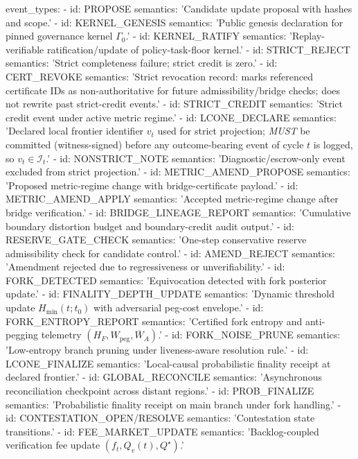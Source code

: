 \documentclass[11pt,a4paper]{article}
\newcommand{\cI}{\mathcal{I}}
\theoremstyle{definition}
\theoremstyle{remark}
\begin{document}
\begin{YAMLtiny}
event_types:
  - id: PROPOSE
    semantics: 'Candidate update proposal with hashes and scope.'
  - id: KERNEL\_GENESIS
    semantics: 'Public genesis declaration for pinned governance kernel $\Gamma_0$.'
  - id: KERNEL\_RATIFY
    semantics: 'Replay-verifiable ratification/update of policy-task-floor kernel.'
  - id: STRICT\_REJECT
    semantics: 'Strict completeness failure; strict credit is zero.'
  - id: CERT\_REVOKE
    semantics: 'Strict revocation record: marks referenced certificate IDs as non-authoritative for future admissibility/bridge checks; does not rewrite past strict-credit events.'
  - id: STRICT\_CREDIT
    semantics: 'Strict credit event under active metric regime.'
  - id: LCONE\_DECLARE
    semantics: 'Declared local frontier identifier $v_t$ used for strict projection; \emph{MUST} be committed (witness-signed) before any outcome-bearing event of cycle $t$ is logged, so $v_t\in\cI_t$.'
  - id: NONSTRICT\_NOTE
    semantics: 'Diagnostic/escrow-only event excluded from strict projection.'
  - id: METRIC\_AMEND\_PROPOSE
    semantics: 'Proposed metric-regime change with bridge-certificate payload.'
  - id: METRIC\_AMEND\_APPLY
    semantics: 'Accepted metric-regime change after bridge verification.'
  - id: BRIDGE\_LINEAGE\_REPORT
    semantics: 'Cumulative boundary distortion budget and boundary-credit audit output.'
  - id: RESERVE\_GATE\_CHECK
    semantics: 'One-step conservative reserve admissibility check for candidate control.'
  - id: AMEND\_REJECT
    semantics: 'Amendment rejected due to regressiveness or unverifiability.'
  - id: FORK\_DETECTED
    semantics: 'Equivocation detected with fork posterior update.'
  - id: FINALITY\_DEPTH\_UPDATE
    semantics: 'Dynamic threshold update $H_{\min}(t;t_0)$ with adversarial peg-cost envelope.'
  - id: FORK\_ENTROPY\_REPORT
    semantics: 'Certified fork entropy and anti-pegging telemetry $(H_F,W_{\mathrm{peg}},\overline W_A)$.'
  - id: FORK\_NOISE\_PRUNE
    semantics: 'Low-entropy branch pruning under liveness-aware resolution rule.'
  - id: LCONE\_FINALIZE
    semantics: 'Local-causal probabilistic finality receipt at declared frontier.'
  - id: GLOBAL\_RECONCILE
    semantics: 'Asynchronous reconciliation checkpoint across distant regions.'
  - id: PROB\_FINALIZE
    semantics: 'Probabilistic finality receipt on main branch under fork handling.'
  - id: CONTESTATION\_OPEN/RESOLVE
    semantics: 'Contestation state transitions.'
  - id: FEE\_MARKET\_UPDATE
    semantics: 'Backlog-coupled verification fee update $(f_t,Q_v(t),Q^\star)$.'

\end{YAMLtiny}
\end{document}
